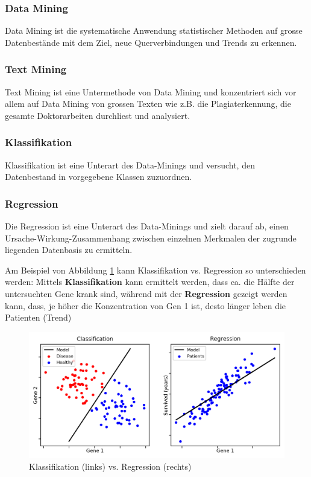\documentclass[a4paper, 11pt]{article}
\begin{document}
\subsubsection{Data Mining}
 Data Mining ist die systematische Anwendung statistischer Methoden auf grosse Datenbestände mit dem Ziel, neue Querverbindungen und Trends zu erkennen.

\subsubsection{Text Mining}
 Text Mining ist eine Untermethode von Data Mining und konzentriert sich vor allem auf Data Mining von grossen Texten wie z.B. die Plagiaterkennung, die gesamte Doktorarbeiten durchliest und analysiert.
 
 \subsubsection{Klassifikation}
 Klassifikation ist eine Unterart des Data-Minings und versucht, den Datenbestand in vorgegebene Klassen zuzuordnen.
 
 \subsubsection{Regression}
 Die Regression ist eine Unterart des Data-Minings und zielt darauf ab, einen Ursache-Wirkung-Zusammenhang zwischen einzelnen Merkmalen der zugrunde liegenden Datenbasis zu ermitteln. 
 
 Am Beispiel von Abbildung \ref{fig:regclass} kann Klassifikation vs. Regression so unterschieden werden: Mittels \textbf{Klassifikation} kann ermittelt werden, dass ca. die Hälfte der untersuchten Gene krank sind, während mit der \textbf{Regression} gezeigt werden kann, dass, je höher die Konzentration von Gen 1 ist, desto länger leben die Patienten (Trend)
 
 \begin{figure}[htb]
 	\centering
 	\includegraphics[keepaspectratio=true,height=15\baselineskip]{regressionvsclassification.png}
 	\caption{Klassifikation (links) vs. Regression (rechts)}
 	\label{fig:regclass}
 \end{figure}
\end{document}
